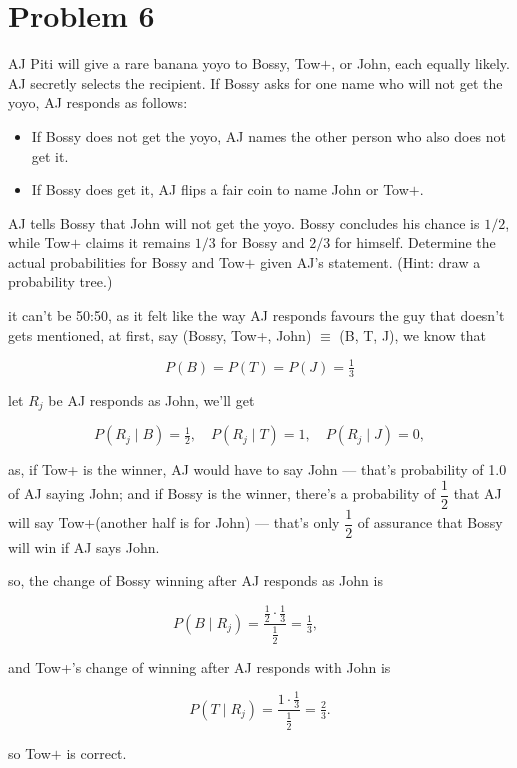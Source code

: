 \section*{Problem 6}
AJ Piti will give a rare banana yoyo to Bossy, Tow$+$, or John, each equally likely. AJ secretly selects the recipient. If Bossy asks for one name who will not get the yoyo, AJ responds as follows:
\begin{itemize}
    \item If Bossy does not get the yoyo, AJ names the other person who also does not get it.
    \item If Bossy does get it, AJ flips a fair coin to name John or Tow$+$.
\end{itemize}
AJ tells Bossy that John will not get the yoyo. Bossy concludes his chance is $1/2$, while Tow$+$ claims it remains $1/3$ for Bossy and $2/3$ for himself. Determine the actual probabilities for Bossy and Tow$+$ given AJ's statement. (Hint: draw a probability tree.)

\medskip
\solution

it can't be 50:50, as it felt like the way AJ responds favours the guy that doesn't gets mentioned, at first, say (Bossy, Tow+, John) $\equiv$ (B, T, J), we know that

\[P(B)=P(T)=P(J)=\tfrac{1}{3}\]

let $R_j$ be AJ responds as John, we'll get 

\[
P(R_j\mid B)=\tfrac{1}{2},\quad P(R_j\mid T)=1,\quad P(R_j\mid J)=0,
\]

as, if Tow+ is the winner, AJ would have to say John --- that's probability of 1.0 of AJ saying John; and if Bossy is the winner, there's a probability of $\dfrac{1}{2}$ that AJ will say Tow+(another half is for John) --- that's only $\dfrac{1}{2}$ of assurance that Bossy will win if AJ says John. 

\vspace{1em}

so, the change of Bossy winning after AJ responds as John is

\[
P(B\mid R_j)=\frac{\frac{1}{2}\cdot\frac{1}{3}}{\frac{1}{2}}=\boxed{\tfrac{1}{3}},\qquad
\]

and Tow+'s change of winning after AJ responds with John is

\[
P(T\mid R_j)=\frac{1\cdot\frac{1}{3}}{\frac{1}{2}}=\boxed{\tfrac{2}{3}}.
\]

so Tow$+$ is correct.


